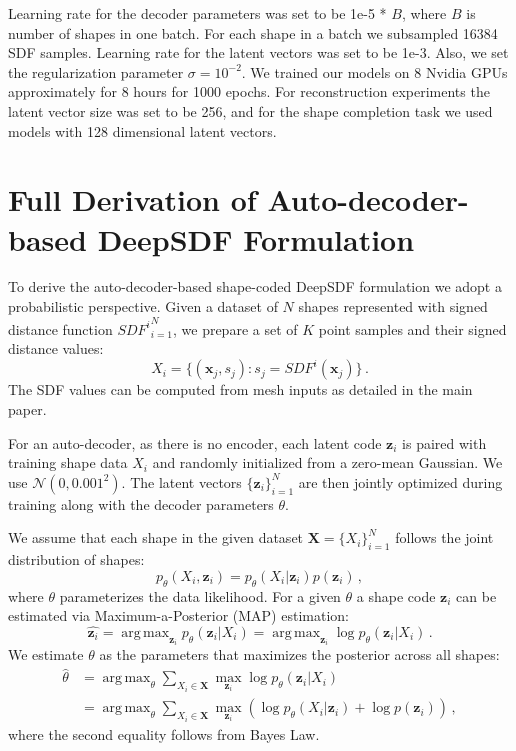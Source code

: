 \documentclass[10pt,twocolumn,letterpaper]{article}
\DeclareMathOperator*{\argmax}{arg\,max}
\begin{document}
Learning rate for the decoder parameters was set to be 1e-5 * $B$, where $B$ is number of shapes in one batch. For each shape in a batch we subsampled 16384 SDF samples. Learning rate for the latent vectors was set to be 1e-3. Also, we set the regularization parameter $\sigma=10^{-2}$. We trained our models on 8 Nvidia GPUs approximately for 8 hours for 1000 epochs. For reconstruction experiments the latent vector size was set to be 256, and for the shape completion task we used models with 128 dimensional latent vectors.

\section{Full Derivation of Auto-decoder-based DeepSDF Formulation} \label{sec:autodecoder}
To derive the auto-decoder-based shape-coded DeepSDF formulation we adopt a probabilistic perspective. 
Given a dataset of $N$ shapes represented with signed distance function ${SDF^i}_{i=1}^{N}$, we prepare a set of $K$ point samples and their signed distance values:
\begin{equation} \label{eq:datapoint}
X_i = \{(\bm{x}_j,s_j):s_j=SDF^i(\bm{x}_j)\}\,.
\end{equation}
The SDF values can be computed from mesh inputs as detailed in the main paper.

For an auto-decoder, as there is no encoder, each latent code $\bm{z}_i$ is paired with training shape data $X_i$ and randomly initialized from a zero-mean Gaussian. We use $\mathcal{N}(0,0.001^2)$.
The latent vectors $\{\bm{z}_i\}_{i=1}^N$ are then jointly optimized during training along with the decoder parameters $\theta$.

We assume that each shape in the given dataset $\bm{X}=\{X_i\}_{i=1}^N$ follows the joint distribution of shapes:
\begin{equation}
p_{\theta}(X_i,\bm{z}_i)=p_{\theta}(X_i|\bm{z}_i)p(\bm{z}_i)\,,
\end{equation}
where $\theta$ parameterizes the data likelihood. For a given $\theta$ a shape code $\bm{z}_i$ can be estimated via Maximum-a-Posterior (MAP) estimation:
\begin{equation}\label{eq:codeMAPgeneral}
\hat{\bm{z}_i}=\argmax_{\bm{z}_i}p_{\theta}(\bm{z}_i|X_i)=\argmax_{\bm{z}_i}\log p_{\theta}(\bm{z}_i|X_i)\,.
\end{equation}
We estimate $\theta$ as the parameters that maximizes the posterior across all shapes:
\begin{align} \label{eq:MAP}
\hat{\theta}&=\argmax_{\theta}\sum_{X_i\in \bm{X}} \max_{\bm{z}_i}\log p_{\theta}(\bm{z}_i|X_i) \\ \nonumber
& =\argmax_{\theta}\sum_{X_i\in \bm{X}} \max_{\bm{z}_i} (\log p_{\theta}(X_i|\bm{z}_i) + \log p(\bm{z}_i))\,,
\end{align}
where the second equality follows from Bayes Law.
\end{document}

